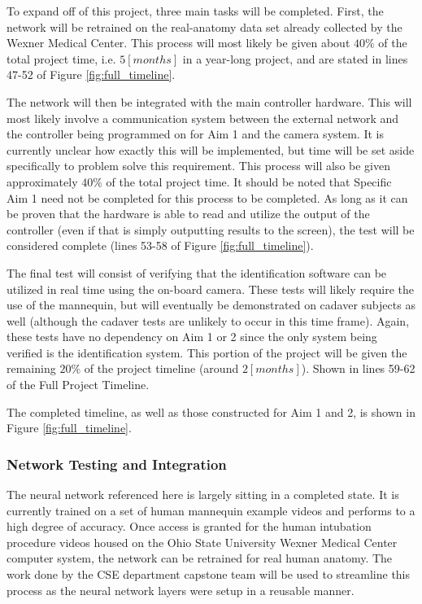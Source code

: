 		To expand off of this project, three main tasks will be completed. First, the network will be retrained on the real-anatomy data set already collected by the Wexner Medical Center. This process will most likely be given about $40\%$ of the total project time, i.e. $5[months]$ in a year-long project, and are stated in lines 47-52 of Figure \ref{fig:full_timeline}.
		
		The network will then be integrated with the main controller hardware. This will most likely involve a communication system between the external network and the controller being programmed on for Aim 1 and the camera system. It is currently unclear how exactly this will be implemented, but time will be set aside specifically to problem solve this requirement. This process will also be given approximately $40\%$ of the total project time. It should be noted that Specific Aim 1 need not be completed for this process to be completed. As long as it can be proven that the hardware is able to read and utilize the output of the controller (even if that is simply outputting results to the screen), the test will be considered complete (lines 53-58 of Figure \ref{fig:full_timeline}).
		
		The final test will consist of verifying that the identification software can be utilized in real time using the on-board camera. These tests will likely require the use of the mannequin, but will eventually be demonstrated on cadaver subjects as well (although the cadaver tests are unlikely to occur in this time frame). Again, these tests have no dependency on Aim 1 or 2 since the only system being verified is the identification system. This portion of the project will be given the remaining $20\%$ of the project timeline (around $2[months]$). Shown in lines 59-62 of the Full Project Timeline.

		The completed timeline, as well as those constructed for Aim 1 and 2, is shown in Figure \ref{fig:full_timeline}.
		
	\subsubsection{Network Testing and Integration}
		The neural network referenced here is largely sitting in a completed state. It is currently trained on a set of human mannequin example videos and performs to a high degree of accuracy. Once access is granted for the human intubation procedure videos housed on the Ohio State University Wexner Medical Center computer system, the network can be retrained for real human anatomy. The work done by the CSE department capstone team will be used to streamline this process as the neural network layers were setup in a reusable manner.

